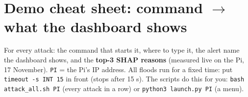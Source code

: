 \documentclass[11pt,a4paper]{article}
\newcommand{\file}[1]{\texttt{\small #1}}
\begin{document}
\newpage
\section{Demo cheat sheet: command $\rightarrow$ what the dashboard shows}

For every attack: the command that starts it, where to type it, the alert name the dashboard shows, and the
\textbf{top-3 SHAP reasons} (measured live on the Pi, 17 November). \file{PI} = the Pi's IP address.
All floods run for a fixed time: put \texttt{timeout -s INT 15} in front (stops after 15 s). The scripts do this
for you: \texttt{bash attack\_all.sh PI} (every attack in a row) or \texttt{python3 launch.py PI} (a menu).

\newcommand{\cmd}[1]{\texttt{\scriptsize #1}}
\newcommand{\where}[1]{\par{\scriptsize\color{black!60}#1}}
\newcommand{\shap}[1]{\textcolor{bModel}{\texttt{\scriptsize #1}}}
\newcommand{\rul}[1]{\textcolor{bRule}{\texttt{\scriptsize #1}}}
\end{document}
